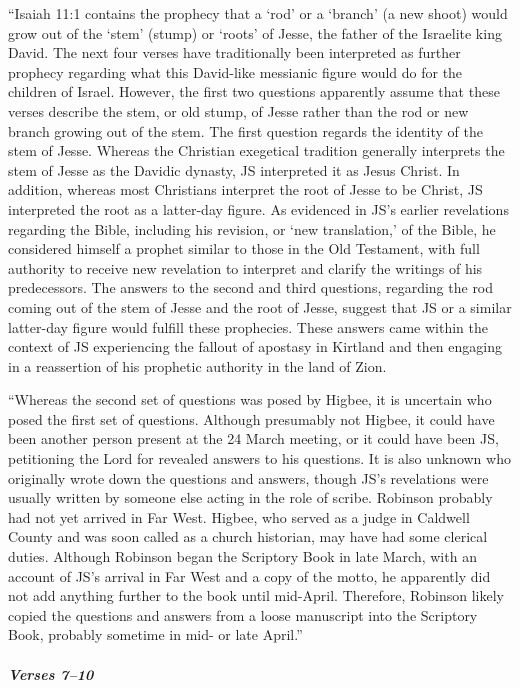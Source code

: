 				``Isaiah 11:1 contains the prophecy that a `rod' or a `branch' (a new shoot) would grow out of the `stem' (stump) or `roots' of Jesse, the father of the Israelite king David. The next four verses have traditionally been interpreted as further prophecy regarding what this David-like messianic figure would do for the children of Israel. However, the first two questions apparently assume that these verses describe the stem, or old stump, of Jesse rather than the rod or new branch growing out of the stem. The first question regards the identity of the stem of Jesse. Whereas the Christian exegetical tradition generally interprets the stem of Jesse as the Davidic dynasty, JS interpreted it as Jesus Christ. In addition, whereas most Christians interpret the root of Jesse to be Christ, JS interpreted the root as a latter-day figure. As evidenced in JS's earlier revelations regarding the Bible, including his revision, or `new translation,' of the Bible, he considered himself a prophet similar to those in the Old Testament, with full authority to receive new revelation to interpret and clarify the writings of his predecessors. The answers to the second and third questions, regarding the rod coming out of the stem of Jesse and the root of Jesse, suggest that JS or a similar latter-day figure would fulfill these prophecies. These answers came within the context of JS experiencing the fallout of apostasy in Kirtland and then engaging in a reassertion of his prophetic authority in the land of Zion.

				``Whereas the second set of questions was posed by Higbee, it is uncertain who posed the first set of questions. Although presumably not Higbee, it could have been another person present at the 24 March meeting, or it could have been JS, petitioning the Lord for revealed answers to his questions. It is also unknown who originally wrote down the questions and answers, though JS's revelations were usually written by someone else acting in the role of scribe. Robinson probably had not yet arrived in Far West. Higbee, who served as a judge in Caldwell County and was soon called as a church historian, may have had some clerical duties. Although Robinson began the Scriptory Book in late March, with an account of JS's arrival in Far West and a copy of the motto, he apparently did not add anything further to the book until mid-April. Therefore, Robinson likely copied the questions and answers from a loose manuscript into the Scriptory Book, probably sometime in mid- or late April.''
			
			\subparagraph{Verses 7--10}
			
